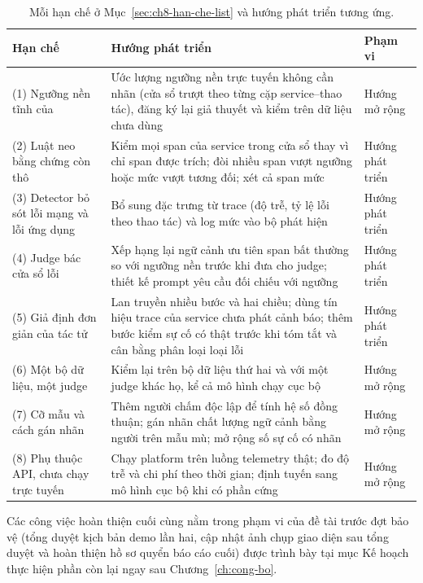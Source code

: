 \begin{table}[H]
  \centering
  \caption[Hạn chế và hướng phát triển tương ứng]{Mỗi hạn chế ở Mục~\ref{sec:ch8-han-che-list} và hướng phát triển tương ứng.}
  \label{tab:ch8-huong}
  \tblfont
  \tblsetup
  \setlength{\tabcolsep}{3.5pt}
  \begin{tabularx}{\linewidth}{|>{\raggedright\arraybackslash}p{3.3cm}|Y|>{\raggedright\arraybackslash}p{2.6cm}|}
    \hline
    \textbf{Hạn chế} & \textbf{Hướng phát triển} & \textbf{Phạm vi} \\
    \hline
    (1) Ngưỡng nền tĩnh của  & Ước lượng ngưỡng nền trực tuyến không cần nhãn (cửa sổ trượt theo từng cặp service--thao tác), đăng ký lại giả thuyết và kiểm trên dữ liệu chưa dùng & Hướng mở rộng \\
    \hline
    (2) Luật neo bằng chứng còn thô & Kiểm mọi span của service trong cửa sổ thay vì chỉ span được trích; đòi nhiều span vượt ngưỡng hoặc mức vượt tương đối; xét cả span mức  & Hướng phát triển \\
    \hline
    (3) Detector bỏ sót lỗi mạng và lỗi ứng dụng & Bổ sung đặc trưng từ trace (độ trễ, tỷ lệ lỗi theo thao tác) và log mức  vào bộ phát hiện & Hướng phát triển \\
    \hline
    (4) Judge bác cửa sổ lỗi & Xếp hạng lại ngữ cảnh ưu tiên span bất thường so với ngưỡng nền trước khi đưa cho judge; thiết kế prompt yêu cầu đối chiếu với ngưỡng & Hướng phát triển \\
    \hline
    (5) Giả định đơn giản của tác tử  & Lan truyền nhiều bước và hai chiều; dùng tín hiệu trace của service chưa phát cảnh báo; thêm bước kiểm sự cố có thật trước khi tóm tắt và cân bằng phân loại loại lỗi & Hướng phát triển \\
    \hline
    (6) Một bộ dữ liệu, một judge & Kiểm lại trên bộ dữ liệu thứ hai và với một judge khác họ, kể cả mô hình chạy cục bộ & Hướng mở rộng \\
    \hline
    (7) Cỡ mẫu và cách gán nhãn & Thêm người chấm độc lập để tính hệ số đồng thuận; gán nhãn chất lượng ngữ cảnh bằng người trên mẫu mù; mở rộng số sự cố có nhãn & Hướng mở rộng \\
    \hline
    (8) Phụ thuộc API, chưa chạy trực tuyến & Chạy platform trên luồng telemetry thật; đo độ trễ và chi phí theo thời gian; định tuyến sang mô hình cục bộ khi có phần cứng & Hướng mở rộng \\
    \hline
  \end{tabularx}
\end{table}

Các công việc hoàn thiện cuối cùng nằm trong phạm vi của đề tài trước đợt bảo vệ (tổng duyệt kịch bản demo lần hai, cập nhật ảnh chụp giao diện sau tổng duyệt và hoàn thiện hồ sơ quyển báo cáo cuối) được trình bày tại mục Kế hoạch thực hiện phần còn lại ngay sau Chương~\ref{ch:cong-bo}.
